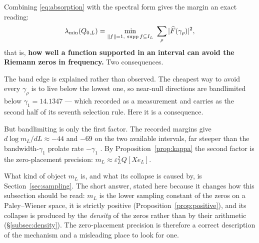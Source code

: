 Combining \eqref{eq:absorption} with the spectral form gives the margin an exact
reading:
\[
 \lambda_{\min}(Q_{0,L})
 =\min_{\lVert f\rVert=1,\ \operatorname{supp} f\subseteq I_L}\ \sum_\rho|\widehat F(\gamma_\rho)|^2 ,
\]
that is, \textbf{how well a function supported in an interval can avoid the
Riemann zeros in frequency.} Two consequences.

The band edge is explained rather than observed. The cheapest way to avoid every
$\gamma_\rho$ is to live below the lowest one, so near-null directions are
bandlimited below $\gamma_1=14.1347$ --- which \cite{Bottleneck} recorded as a
measurement and \cite{Selection} carries as the second half of its seventh
selection rule. Here it is a consequence.

But bandlimiting is only the first factor. The recorded margins give
$d\log m_L/dL\approx-44$ and $-69$ on the two available intervals, far steeper
than the bandwidth-$\gamma_1$ prolate rate $-\gamma_1$ \cite{SlepianPollak}. By
Proposition~\ref{prop:kappa} the second factor is the zero-placement precision:
$m_L\approx\varepsilon_L^2Q[Xe_L]$.

What kind of object $m_L$ is, and what its collapse is caused by, is
Section~\ref{sec:sampling}. The short answer, stated here because it changes how
this subsection should be read: $m_L$ is the lower sampling constant of the zeros
on a Paley--Wiener space, it is strictly positive
(Proposition~\ref{prop:positive}), and its collapse is produced by the
\emph{density} of the zeros rather than by their arithmetic
(\S\ref{subsec:density}). The zero-placement precision is therefore a correct
description of the mechanism and a misleading place to look for one.

